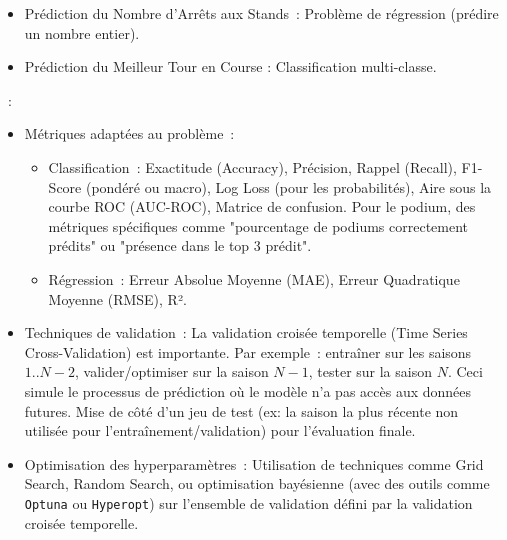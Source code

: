 \documentclass[11pt, a4paper]{article}
\newcommand{\lib}[1]{\texttt{#1}}
\begin{document}
\begin{description}[style=standard, itemsep=0.5em, leftmargin=1.5em]
\begin{itemize}[label=\textbullet, itemsep=0.2em, leftmargin=*]
\begin{itemize}[label=\textendash, itemsep=0.2em, leftmargin=*]
            \item Prédiction du Nombre d'Arrêts aux Stands~: Problème de régression (prédire un nombre entier).
            \item Prédiction du Meilleur Tour en Course : Classification multi-classe.
         \end{itemize}
    \end{itemize}
    \item[Optimisation et Évaluation des Modèles]~:
    \begin{itemize}[label=\textbullet, itemsep=0.2em, leftmargin=*]
        \item Métriques adaptées au problème~:
        \begin{itemize}[label=\textendash, itemsep=0.2em, leftmargin=*]
            \item Classification~: Exactitude (Accuracy), Précision, Rappel (Recall), F1-Score (pondéré ou macro), Log Loss (pour les probabilités), Aire sous la courbe ROC (AUC-ROC), Matrice de confusion. Pour le podium, des métriques spécifiques comme "pourcentage de podiums correctement prédits" ou "présence dans le top 3 prédit".
            \item Régression~: Erreur Absolue Moyenne (MAE), Erreur Quadratique Moyenne (RMSE), R².
        \end{itemize}
        \item Techniques de validation~: La validation croisée temporelle (Time Series Cross-Validation) est importante. Par exemple~: entraîner sur les saisons $1..N-2$, valider/optimiser sur la saison $N-1$, tester sur la saison $N$. Ceci simule le processus de prédiction où le modèle n'a pas accès aux données futures. Mise de côté d'un jeu de test (ex: la saison la plus récente non utilisée pour l'entraînement/validation) pour l'évaluation finale. %
        \item Optimisation des hyperparamètres~: Utilisation de techniques comme Grid Search, Random Search, ou optimisation bayésienne (avec des outils comme \lib{Optuna} ou \lib{Hyperopt}) sur l'ensemble de validation défini par la validation croisée temporelle.
    \end{itemize}
\end{description}

\medskip
\end{document}
